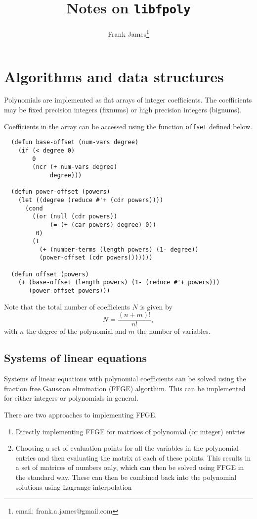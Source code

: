 \documentclass{article}
\title{Notes on {\tt libfpoly}}
\author{Frank James\thanks{email: frank.a.james@gmail.com}}
\begin{document}
\maketitle

\section{Algorithms and data structures}
Polynomials are implemented as flat arrays of integer coefficients. The coefficients may be fixed precision integers (fixnums)
or high precision integers (bignums).

Coefficients in the array can be accessed using the function {\tt offset} defined below. 
\begin{lstlisting}
  (defun base-offset (num-vars degree)
    (if (< degree 0)
        0
        (ncr (+ num-vars degree)
             degree)))

  (defun power-offset (powers)
    (let ((degree (reduce #'+ (cdr powers))))
      (cond
        ((or (null (cdr powers))
             (= (+ (car powers) degree) 0))
         0)
        (t
          (+ (number-terms (length powers) (1- degree))
          (power-offset (cdr powers)))))))

  (defun offset (powers)
    (+ (base-offset (length powers) (1- (reduce #'+ powers)))
       (power-offset powers)))
\end{lstlisting}

Note that the total number of coefficients $N$ is given by
\begin{equation}
  N = \frac{(n + m)!}{n!},
\end{equation}
with $n$ the degree of the polynomial and $m$ the number of variables.


\subsection{Systems of linear equations}
Systems of linear equations with polynomial coefficients can be solved using the fraction free Gaussian elimination (FFGE) algorthim.
This can be implemented for either integers or polynomials in general.

There are two approaches to implementing FFGE.
\begin{enumerate}
  \item
    Directly implementing FFGE for matrices of polynomial (or integer) entries
  \item
    Choosing a set of evaluation points for all the variables in the polynomial entries and then evaluating
    the matrix at each of these points. This results in a set of matrices of numbers only, which can then be
    solved using FFGE in the standard way. These can then be combined back into the polynomial solutions using
    Lagrange interpolation
\end{enumerate}
\end{document}
